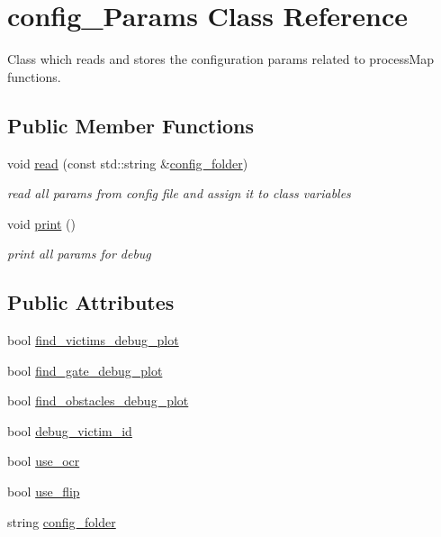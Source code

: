 \hypertarget{classconfig__Params}{}\section{config\+\_\+\+Params Class Reference}
\label{classconfig__Params}


Class which reads and stores the configuration params related to process\+Map functions.  


\subsection*{Public Member Functions}
\begin{DoxyCompactItemize}
\item 
void \hyperlink{classconfig__Params_af3013698ef0b60ee276744fc2857c902}{read} (const std\+::string \&\hyperlink{classconfig__Params_a7a97ddbf1ad5e453973c74599d6ba008}{config\+\_\+folder})
\begin{DoxyCompactList}\small\item\em read all params from config file and assign it to class variables \end{DoxyCompactList}\item 
void \hyperlink{classconfig__Params_a4af0efea166c2bcfbff384fe35d0ce70}{print} ()
\begin{DoxyCompactList}\small\item\em print all params for debug \end{DoxyCompactList}\end{DoxyCompactItemize}
\subsection*{Public Attributes}
\begin{DoxyCompactItemize}
\item 
bool \hyperlink{classconfig__Params_a59864ae7066a22a6f1351fa5c12062c0}{find\+\_\+victims\+\_\+debug\+\_\+plot}
\item 
bool \hyperlink{classconfig__Params_ad4a4cb85eaf8e525489432353cc7efd5}{find\+\_\+gate\+\_\+debug\+\_\+plot}
\item 
bool \hyperlink{classconfig__Params_a81fcbdd376e37ce57fa0172879f1b414}{find\+\_\+obstacles\+\_\+debug\+\_\+plot}
\item 
bool \hyperlink{classconfig__Params_ad05db8c647135b2b9c4315a98e007479}{debug\+\_\+victim\+\_\+id}
\item 
bool \hyperlink{classconfig__Params_a4229ef753b2a5c50fbe73cf6b91cb9db}{use\+\_\+ocr}
\item 
bool \hyperlink{classconfig__Params_a1d6f37fc963e52c0ab79ee953a0057b4}{use\+\_\+flip}
\item 
string \hyperlink{classconfig__Params_a7a97ddbf1ad5e453973c74599d6ba008}{config\+\_\+folder}
\end{DoxyCompactItemize}


